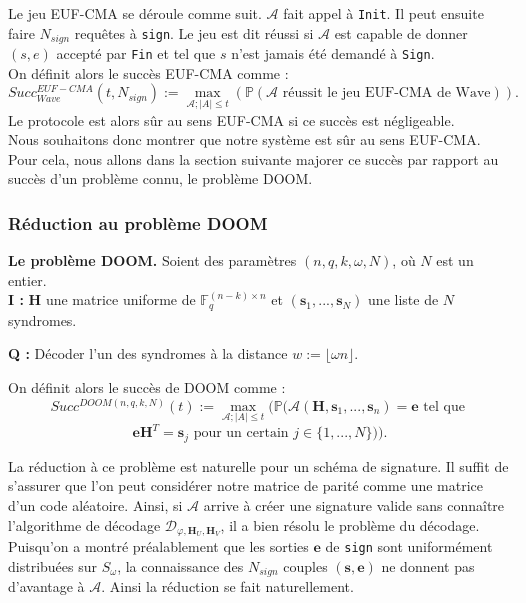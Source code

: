 \documentclass[12pt]{article}
\theoremstyle{plain}
\theoremstyle{definition}
\newcommand{\F}{\mathbb{F}}
\newcommand{\e}{\mathbf{e}}
\newcommand{\s}{\mathbf{s}}
\begin{document}
\noindent Le jeu EUF-CMA se déroule comme suit. $\mathcal{A}$ fait appel à \verb|Init|. Il peut ensuite faire $N_{sign}$ requêtes à \verb|sign|. Le jeu est dit réussi si $\mathcal{A}$ est capable de donner $(s,e)$ accepté par \verb|Fin| et tel que $s$ n'est jamais été demandé à \verb|Sign|. \\
On définit alors le succès EUF-CMA comme :
$$Succ^{EUF-CMA}_{Wave}(t,N_{sign}) := \max_{\mathcal{A};|A|\leq t}(\mathbb{P}(\mathcal{A}\text{ réussit le jeu EUF-CMA de Wave})).$$
Le protocole est alors sûr au sens EUF-CMA si ce succès est négligeable. \\

\noindent Nous souhaitons donc montrer que notre système est sûr au sens EUF-CMA. Pour cela, nous allons dans la section suivante majorer ce succès par rapport au succès d'un problème connu, le problème DOOM.


\subsubsection{Réduction au problème DOOM}
\textbf{Le problème DOOM.} Soient des paramètres $(n,q,k,\omega,N)$, où $N$ est un entier. \\

\leftskip=1cm
\noindent \textbf{I :} $\mathbf{H}$ une matrice uniforme de $\F_q^{(n-k)\times n}$ et $(\mathbf{s}_1,...,\mathbf{s}_N)$ une liste de $N$ syndromes. 

\noindent \textbf{Q :} Décoder l'un des syndromes à la distance $w := \lfloor \omega n \rfloor$. \\

\leftskip=0cm

\noindent On définit alors le succès de DOOM comme :
$$Succ^{DOOM(n,q,k,N)}(t) := \max_{\mathcal{A};|A|\leq t}(\mathbb{P}(\mathcal{A}(\mathbf{H},\mathbf{s}_1,...,\mathbf{s}_n)=\mathbf{e}\text{ tel que }$$
$$ \mathbf{eH}^T = \mathbf{s}_j \text{ pour un certain } j \in \{1,...,N\})).$$

\noindent La réduction à ce problème est naturelle pour un schéma de signature. Il suffit de s'assurer que l'on peut considérer notre matrice de parité comme une matrice d'un code aléatoire. Ainsi, si $\mathcal{A}$ arrive à créer une signature valide sans connaître l'algorithme de décodage $\mathcal{D}_{\varphi,\mathbf{H}_{U},\mathbf{H}_{V}}$, il a bien résolu le problème du décodage. Puisqu'on a montré préalablement que les sorties $\e$ de \verb|sign| sont uniformément distribuées sur $S_{\omega}$, la connaissance des $N_{sign}$ couples $(\s,\e)$ ne donnent pas d'avantage à $\mathcal{A}$. Ainsi la réduction se fait naturellement. \\
\end{document}
